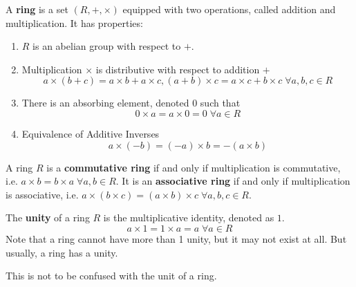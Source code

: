 \documentclass{article}
\begin{document}
    \begin{definition}[Ring]
      A \textbf{ring} is a set $(R, +, \times)$ equipped with two operations, called addition and multiplication. It has properties: 
      \begin{enumerate}
        \item $R$ is an abelian group with respect to $+$. 
        \item Multiplication $\times$ is distributive with respect to addition $+$
          \begin{equation}
            a \times (b + c) = a\times b + a\times c, (a+b)\times c = a\times c + b\times c \; \forall a, b, c \in R
          \end{equation}
        \item There is an absorbing element, denoted $0$ such that 
          \begin{equation}
            0\times a = a\times 0 = 0 \; \forall a \in R
          \end{equation}
        \item Equivalence of Additive Inverses
          \begin{equation}
            a \times (-b) = (-a) \times b = - (a\times b)
          \end{equation}
      \end{enumerate}
    \end{definition}

    \begin{definition}
      A ring $R$ is a \textbf{commutative ring} if and only if multiplication is commutative, i.e. $a\times b = b \times a \; \forall a, b \in R$. It is an \textbf{associative ring} if and only if multiplication is associative, i.e. $a \times (b \times c) = (a \times b) \times c \; \forall a, b, c \in R$.
    \end{definition}

    \begin{definition}
      The \textbf{unity} of a ring $R$ is the multiplicative identity, denoted as $1$. 
      \begin{equation}
        a \times 1 = 1 \times a = a \; \forall a \in R
      \end{equation}
      Note that a ring cannot have more than 1 unity, but it may not exist at all. But usually, a ring has a unity.
    \end{definition}

    This is not to be confused with the unit of a ring. 
\end{document}
